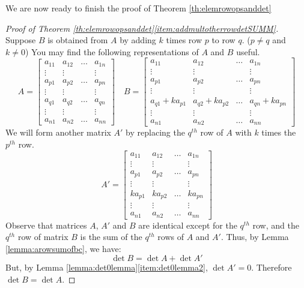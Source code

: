 \documentclass{ximera}
\begin{document}
We are now ready to finish the proof of Theorem \ref{th:elemrowopsanddet}
\begin{proof}[Proof of Theorem \ref{th:elemrowopsanddet}\ref{item:addmultotherrowdetSUMM}]
Suppose $B$ is obtained from $A$ by adding $k$ times row $p$ to row $q$.  ($p\neq q$ and $k\neq 0$)  You may find the following representations of $A$ and $B$ useful.
$$A=\begin{bmatrix} a_{11} & a_{12} & \dots  & a_{1n}  \\
   \vdots & \vdots &  & \vdots \\
   a_{p1} & a_{p2} &\dots  & a_{pn}  \\
   \vdots & \vdots &  & \vdots \\
   a_{q1} & a_{q2} &\dots  & a_{qn}  \\
   \vdots & \vdots &  & \vdots  \\
   a_{n1} & a_{n2} & \dots  & a_{nn}\end{bmatrix}\quad
   B=\begin{bmatrix} a_{11} & a_{12} & \dots  & a_{1n}  \\
   \vdots & \vdots &  & \vdots \\
   a_{p1} & a_{p2} & \dots  & a_{pn}  \\
   \vdots & \vdots &  & \vdots \\
   a_{q1}+ka_{p1} & a_{q2}+ka_{p2} &\dots  & a_{qn}+ka_{pn}  \\
   \vdots & \vdots &  & \vdots  \\
   a_{n1} & a_{n2} & \dots  & a_{nn}\end{bmatrix}$$
We will form another matrix $A'$ by replacing the $q^{th}$ row of $A$ with $k$ times the $p^{th}$ row.
$$A'=\begin{bmatrix} a_{11} & a_{12} & \dots  & a_{1n}  \\
   \vdots & \vdots &  & \vdots \\
   a_{p1} & a_{p2} &\dots  & a_{pn}  \\
   \vdots & \vdots &  & \vdots \\
   ka_{p1} & ka_{p2} &\dots  & ka_{pn}  \\
   \vdots & \vdots &  & \vdots  \\
   a_{n1} & a_{n2} & \dots  & a_{nn}\end{bmatrix}$$
Observe that matrices $A$, $A'$ and $B$ are identical except for the $q^{th}$ row, and the $q^{th}$ row of matrix $B$ is the sum of the $q^{th}$ rows of $A$ and $A'$.  Thus, by Lemma \ref{lemma:arowsumofbc}, we have:
$$\det{B}=\det{A}+\det{A'}$$
But, by Lemma \ref{lemma:det0lemma}\ref{item:det0lemma2}, 
$\det{A'}=0$. Therefore 
$\det{B}=\det{A}$.
   
\end{proof}
\end{document}
